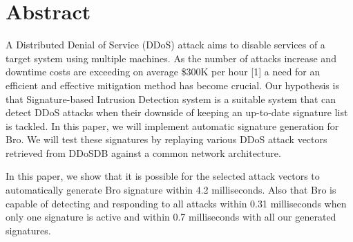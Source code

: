 \section*{Abstract}
\label{section:abstract}
A Distributed Denial of Service (DDoS) attack aims to disable services of a target system using multiple machines. As the number of attacks increase and downtime costs are exceeding on
average \$300K per hour [1] a need for an efficient and effective mitigation method has become crucial. Our hypothesis is that Signature-based Intrusion Detection system is a suitable system that can detect DDoS attacks when their downside of keeping an up-to-date signature list is tackled. In this paper, we will implement automatic signature generation for Bro. We will test these signatures by replaying various DDoS attack vectors retrieved from DDoSDB against a common network architecture.  

In this paper, we show that it is possible for the selected attack vectors to automatically generate Bro signature within 4.2 milliseconds. Also that Bro is capable of detecting and responding to all attacks within 0.31 milliseconds when only one signature is active and within 0.7 milliseconds with all our generated signatures.